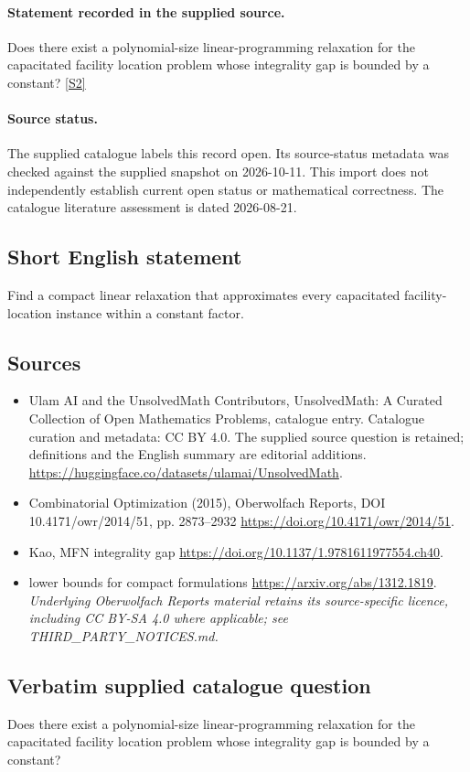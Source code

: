 \documentclass[11pt]{article}
\begin{document}
\paragraph{Statement recorded in the supplied source.}
Does there exist a polynomial-size linear-programming relaxation for the capacitated facility location problem whose integrality gap is bounded by a constant? \href{https://doi.org/10.4171/owr/2014/51}{[S2]}
\paragraph{Source status.}
The supplied catalogue labels this record open. Its source-status metadata was checked against the supplied snapshot on 2026-10-11. This import does not independently establish current open status or mathematical correctness. The catalogue literature assessment is dated 2026-08-21.
\subsection{Short English statement}
Find a compact linear relaxation that approximates every capacitated facility-location instance within a constant factor.
\subsection{Sources}
\begin{itemize}
\item[S1] Ulam AI and the UnsolvedMath Contributors, UnsolvedMath: A Curated Collection of Open Mathematics Problems, catalogue entry. Catalogue curation and metadata: CC BY 4.0. The supplied source question is retained; definitions and the English summary are editorial additions.
\url{https://huggingface.co/datasets/ulamai/UnsolvedMath}.
\item[S2] Combinatorial Optimization (2015), Oberwolfach Reports, DOI 10.4171/owr/2014/51, pp. 2873--2932
\url{https://doi.org/10.4171/owr/2014/51}.
\item[S3] Kao, MFN integrality gap
\url{https://doi.org/10.1137/1.9781611977554.ch40}.
\item[S4] lower bounds for compact formulations
\url{https://arxiv.org/abs/1312.1819}.
\textit{Underlying Oberwolfach Reports material retains its source-specific licence, including CC BY-SA 4.0 where applicable; see THIRD\_PARTY\_NOTICES.md.}
\end{itemize}
\subsection{Verbatim supplied catalogue question}
Does there exist a polynomial-size linear-programming relaxation for the capacitated facility location problem whose integrality gap is bounded by a constant?
\end{document}
